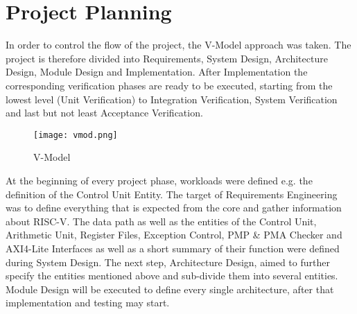 \section{Project Planning}
In order to control the flow of the project, the V-Model approach was taken. The
project is therefore divided into Requirements, System Design, Architecture Design,
Module Design and Implementation. After Implementation the corresponding
verification phases are ready to be executed, starting from the lowest level (Unit
Verification) to Integration Verification, System Verification and last but not least
Acceptance Verification.


\begin{figure}[h]
	\centering
	\texttt{[image: vmod.png]}
	\caption{V-Model}
\end{figure}

At the beginning of every project phase, workloads were defined e.g. the definition of
the Control Unit Entity. The target of Requirements Engineering was to define
everything that is expected from the core and gather information about RISC-V. The
data path as well as the entities of the Control Unit, Arithmetic Unit, Register Files,
Exception Control, \acs{PMP} \& \acs{PMA} Checker and AXI4-Lite Interfaces as well as a short
summary of their function were defined during System Design. The next step,
Architecture Design, aimed to further specify the entities mentioned above and
sub-divide them into several entities. Module Design will be executed to define every
single architecture, after that implementation and testing may start.

